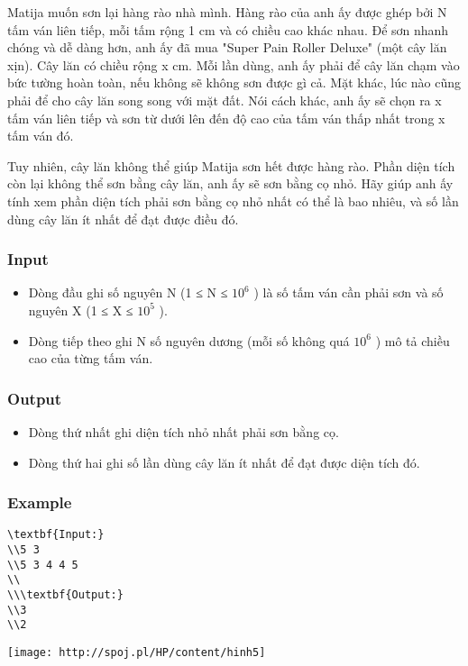 



   Matija muốn sơn lại hàng rào nhà mình. Hàng rào của anh ấy được ghép bởi N tấm ván liên tiếp, mỗi tấm rộng 1 cm và có chiều cao khác nhau. Để sơn nhanh chóng và dễ dàng hơn, anh ấy đã mua "Super Pain Roller Deluxe" (một cây lăn xịn). Cây lăn có chiều rộng x cm. Mỗi lần dùng, anh ấy phải để cây lăn chạm vào bức tường hoàn toàn, nếu không sẽ không sơn được gì cả. Mặt khác, lúc nào cũng phải để cho cây lăn song song với mặt đất. Nói cách khác, anh ấy sẽ chọn ra x tấm ván liên tiếp và sơn từ dưới lên đến độ cao của tấm ván thấp nhất trong x tấm ván đó.  

   Tuy nhiên, cây lăn không thể giúp Matija sơn hết được hàng rào. Phần diện tích còn lại không thể sơn bằng cây lăn, anh ấy sẽ sơn bằng cọ nhỏ. Hãy giúp anh ấy tính xem phần diện tích phải sơn bằng cọ nhỏ nhất có thể là bao nhiêu, và số lần dùng cây lăn ít nhất để đạt được điều đó.  

\subsubsection{   Input  }
\begin{itemize}
	\item     Dòng đầu ghi số nguyên N (1 ≤ N ≤ $10^{6}$    ) là số tấm ván cần phải sơn và số nguyên X (1 ≤ X ≤ $10^{5}$    ).   
	\item     Dòng tiếp theo ghi N số nguyên dương (mỗi số không quá $10^{6}$    ) mô tả chiều cao của từng tấm ván.   
\end{itemize}

\subsubsection{   Output  }
\begin{itemize}
	\item     Dòng thứ nhất ghi diện tích nhỏ nhất phải sơn bằng cọ.   
	\item     Dòng thứ hai ghi số lần dùng cây lăn ít nhất để đạt được diện tích đó.   
\end{itemize}

\subsubsection{   Example  }
\begin{verbatim}
\textbf{Input:}
\\5 3
\\5 3 4 4 5
\\
\\\textbf{Output:}
\\3
\\2\end{verbatim}


\texttt{[image: http://spoj.pl/HP/content/hinh5]}
